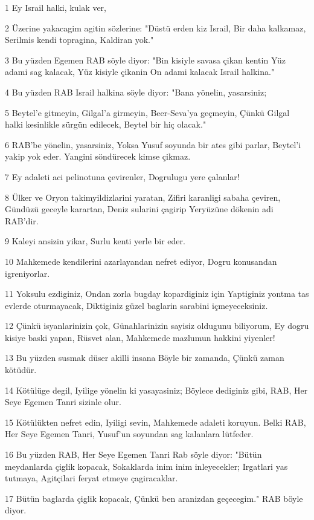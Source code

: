 \par 1 Ey Israil halki, kulak ver,
\par 2 Üzerine yakacagim agitin sözlerine: "Düstü erden kiz Israil, Bir daha kalkamaz, Serilmis kendi topragina, Kaldiran yok."
\par 3 Bu yüzden Egemen RAB söyle diyor: "Bin kisiyle savasa çikan kentin Yüz adami sag kalacak, Yüz kisiyle çikanin On adami kalacak Israil halkina."
\par 4 Bu yüzden RAB Israil halkina söyle diyor: "Bana yönelin, yasarsiniz;
\par 5 Beytel'e gitmeyin, Gilgal'a girmeyin, Beer-Seva'ya geçmeyin, Çünkü Gilgal halki kesinlikle sürgün edilecek, Beytel bir hiç olacak."
\par 6 RAB'be yönelin, yasarsiniz, Yoksa Yusuf soyunda bir ates gibi parlar, Beytel'i yakip yok eder. Yangini söndürecek kimse çikmaz.
\par 7 Ey adaleti aci pelinotuna çevirenler, Dogrulugu yere çalanlar!
\par 8 Ülker ve Oryon takimyildizlarini yaratan, Zifiri karanligi sabaha çeviren, Gündüzü geceyle karartan, Deniz sularini çagirip Yeryüzüne dökenin adi RAB'dir.
\par 9 Kaleyi ansizin yikar, Surlu kenti yerle bir eder.
\par 10 Mahkemede kendilerini azarlayandan nefret ediyor, Dogru konusandan igreniyorlar.
\par 11 Yoksulu ezdiginiz, Ondan zorla bugday kopardiginiz için Yaptiginiz yontma tas evlerde oturmayacak, Diktiginiz güzel baglarin sarabini içmeyeceksiniz.
\par 12 Çünkü isyanlarinizin çok, Günahlarinizin sayisiz oldugunu biliyorum, Ey dogru kisiye baski yapan, Rüsvet alan, Mahkemede mazlumun hakkini yiyenler!
\par 13 Bu yüzden susmak düser akilli insana Böyle bir zamanda, Çünkü zaman kötüdür.
\par 14 Kötülüge degil, Iyilige yönelin ki yasayasiniz; Böylece dediginiz gibi, RAB, Her Seye Egemen Tanri sizinle olur.
\par 15 Kötülükten nefret edin, Iyiligi sevin, Mahkemede adaleti koruyun. Belki RAB, Her Seye Egemen Tanri, Yusuf'un soyundan sag kalanlara lütfeder.
\par 16 Bu yüzden RAB, Her Seye Egemen Tanri Rab söyle diyor: "Bütün meydanlarda çiglik kopacak, Sokaklarda inim inim inleyecekler; Irgatlari yas tutmaya, Agitçilari feryat etmeye çagiracaklar.
\par 17 Bütün baglarda çiglik kopacak, Çünkü ben aranizdan geçecegim." RAB böyle diyor.
